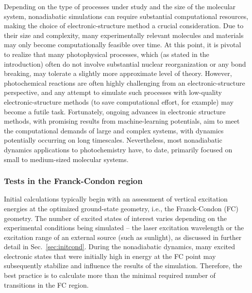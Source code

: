 \documentclass[9pt,bestpractices]{livecoms}
\begin{document}
Depending on the type of processes under study and the size of the molecular system, nonadiabatic simulations can require substantial computational resources, making the choice of electronic-structure method a crucial consideration. Due to their size and complexity, many experimentally relevant molecules and materials may only become computationally feasible over time. At this point, it is pivotal to realize that many photophysical processes, which (as stated in the introduction) often do not involve substantial nuclear reorganization or any bond breaking, may tolerate a slightly more approximate level of theory. However, photochemical reactions are often highly challenging from an electronic-structure perspective, and any attempt to simulate such processes with low-quality electronic-structure methods (to save computational effort, for example) may become a futile task. Fortunately, ongoing advances in electronic structure methods, with promising results from machine-learning potentials, aim to meet the computational demands of large and complex systems, with dynamics potentially occurring on long timescales. Nevertheless, most nonadiabatic dynamics applications to photochemistry have, to date, primarily focused on small to medium-sized molecular systems.

\subsubsection{Tests in the Franck-Condon region}\label{sec:fctest}
Initial calculations typically begin with an assessment of vertical excitation energies at the optimized ground-state geometry, i.e., the Franck-Condon (FC) geometry. The number of excited states of interest varies depending on the experimental conditions being simulated -- the laser excitation wavelength or the excitation range of an external source (such as sunlight), as discussed in further detail in Sec.~\ref{sec:initcond}. During the nonadiabatic dynamics, many excited electronic states that were initially high in energy at the FC point may subsequently stabilize and influence the results of the simulation. Therefore, the best practice is to calculate more than the minimal required number of transitions in the FC region.
\end{document}
